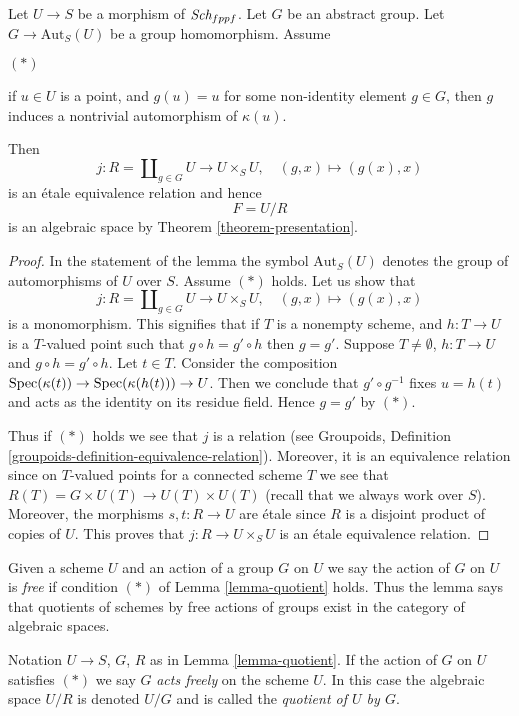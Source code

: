 \begin{lemma}
\label{lemma-quotient}
Let $U \to S$ be a morphism of $\textit{Sch}_{fppf}$.
Let $G$ be an abstract group. Let $G \to \text{Aut}_S(U)$
be a group homomorphism. Assume
\begin{list}{$(*)$}{}
\item if $u \in U$ is a point, and $g(u) = u$
for some non-identity element $g \in G$, then $g$
induces a nontrivial automorphism of $\kappa(u)$.
\end{list}
Then
$$
j :
R = \coprod\nolimits_{g \in G} U
\longrightarrow
U \times_S U,
\quad
(g, x) \longmapsto (g(x), x)
$$
is an \'etale equivalence relation and hence
$$
F = U/R
$$
is an algebraic space by Theorem \ref{theorem-presentation}.
\end{lemma}

\begin{proof}
In the statement of the lemma the symbol $\text{Aut}_S(U)$ denotes
the group of automorphisms of $U$ over $S$.
Assume $(*)$ holds. Let us show that
$$
j :
R = \coprod\nolimits_{g \in G} U
\longrightarrow
U \times_S U,
\quad
(g, x) \longmapsto (g(x), x)
$$
is a monomorphism. This signifies that if $T$ is a nonempty
scheme, and $h : T \to U$ is a $T$-valued point such that
$g \circ h = g' \circ h$ then $g = g'$. Suppose
$T \not = \emptyset$, $h : T \to U$ and $g \circ h = g' \circ h$.
Let $t \in T$. Consider the composition
$\mathop{\rm Spec}(\kappa(t)) \to \mathop{\rm Spec}(\kappa(h(t))) \to U$.
Then we conclude that $g' \circ g^{-1}$ fixes $u = h(t)$ and
acts as the identity on its residue field. Hence $g = g'$ by $(*)$.

\medskip\noindent
Thus if $(*)$ holds we see that $j$ is a relation (see
Groupoids, Definition \ref{groupoids-definition-equivalence-relation}).
Moreover, it is an equivalence relation since on $T$-valued points
for a connected scheme $T$ we see that
$R(T) = G \times U(T) \to U(T) \times U(T)$ (recall that we always
work over $S$). Moreover, the morphisms $s, t : R \to U$ are \'etale
since $R$ is a disjoint product of copies of $U$.
This proves that $j : R \to U \times_S U$ is an \'etale equivalence relation.
\end{proof}

\noindent
Given a scheme $U$ and an action of a group $G$ on $U$ we say the action
of $G$ on $U$ is {\it free} if condition $(*)$ of Lemma \ref{lemma-quotient}
holds. Thus the lemma says that quotients of schemes by free actions
of groups exist in the category of algebraic spaces.

\begin{definition}
\label{definition-quotient}
Notation $U \to S$, $G$, $R$ as in Lemma \ref{lemma-quotient}.
If the action of $G$ on $U$ satisfies $(*)$ we say $G$ {\it acts freely}
on the scheme $U$. In this case the algebraic space $U/R$ is denoted
$U/G$ and is called the {\it quotient of $U$ by $G$}.
\end{definition}

